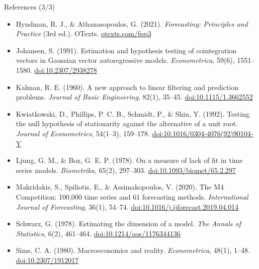 \begin{frame}{References (3/3)}
\itemsize{\scriptsize}
\begin{itemize}
    \item Hyndman, R. J., \& Athanasopoulos, G. (2021). \textit{Forecasting: Principles and Practice} (3rd ed.). OTexts. \href{https://otexts.com/fpp3/}{otexts.com/fpp3}
    \item Johansen, S. (1991). Estimation and hypothesis testing of cointegration vectors in Gaussian vector autoregressive models. \textit{Econometrica}, 59(6), 1551--1580. \href{https://doi.org/10.2307/2938278}{doi:10.2307/2938278}
    \item Kalman, R. E. (1960). A new approach to linear filtering and prediction problems. \textit{Journal of Basic Engineering}, 82(1), 35--45. \href{https://doi.org/10.1115/1.3662552}{doi:10.1115/1.3662552}
    \item Kwiatkowski, D., Phillips, P. C. B., Schmidt, P., \& Shin, Y. (1992). Testing the null hypothesis of stationarity against the alternative of a unit root. \textit{Journal of Econometrics}, 54(1--3), 159--178. \href{https://doi.org/10.1016/0304-4076(92)90104-Y}{doi:10.1016/0304-4076(92)90104-Y}
    \item Ljung, G. M., \& Box, G. E. P. (1978). On a measure of lack of fit in time series models. \textit{Biometrika}, 65(2), 297--303. \href{https://doi.org/10.1093/biomet/65.2.297}{doi:10.1093/biomet/65.2.297}
    \item Makridakis, S., Spiliotis, E., \& Assimakopoulos, V. (2020). The M4 Competition: 100,000 time series and 61 forecasting methods. \textit{International Journal of Forecasting}, 36(1), 54--74. \href{https://doi.org/10.1016/j.ijforecast.2019.04.014}{doi:10.1016/j.ijforecast.2019.04.014}
    \item Schwarz, G. (1978). Estimating the dimension of a model. \textit{The Annals of Statistics}, 6(2), 461--464. \href{https://doi.org/10.1214/aos/1176344136}{doi:10.1214/aos/1176344136}
    \item Sims, C. A. (1980). Macroeconomics and reality. \textit{Econometrica}, 48(1), 1--48. \href{https://doi.org/10.2307/1912017}{doi:10.2307/1912017}
\end{itemize}
\end{frame}


